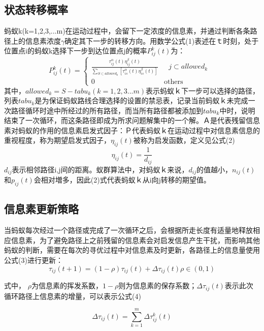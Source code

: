 \documentclass[10pt,a4paper,twocolumn,twoside,UTF8]{ctexart}
\begin{document}
	\subsection{状态转移概率}
	蚂蚁k(k=1,2,3,...m)在运动过程中，会留下一定浓度的信息素，并通过判断各条路径上的信息素浓度$\gamma$确定其下一步的转移方向。用数学公式(1)表述在ｔ时刻，处于位置点i的蚂蚁k选择下一步到达位置点j的概率$P_{ij}^k(t)$为：
		\begin{equation}
			P_{ij}^k(t)=
				\begin{cases}
				\frac{{\tau^ \alpha _{ij}(t) \eta ^ \beta _{ij}(t) }} {{\sum\limits_{S \subset allowed_k} [\tau^ \alpha_{is}(t) \eta^ \beta_{is}(t)] }}& \text{ $j \subset allowed_k$ }\\
				0& \text{others}
				\end{cases}
		\end{equation}	
	其中，$allowed_k = S-tabu_k(k=1,2,3...m)$表示蚂蚁ｋ下一步可以选择的路径，列表$tabu_k$是为保证蚂蚁路线合理选择的设置的禁忌表，记录当前蚂蚁ｋ未完成一次路径循环时途中所经过的所有路径，而当所有路径都被添加到$tabu_k$中时，说明结束了一次循环，而这条路径即成为所求问题解集中的一个解。Ａ是代表残留信息素对蚂蚁的作用的信息素启发式因子：Ｐ代表蚂蚁ｋ在运动过程中对信息素信息的重视程度，称为期望启发式因子，$\eta_{ij}(t)$被称为启发函数，定义见公式(2)
		\begin{equation}
		\eta_{ij}(t) = \frac{1}{d_{ij}}
		\end{equation}
	$d_{ij}$表示相邻路径i,j间的距离。蚁群算法中，对蚂蚁ｋ来说，$d_{ij}$的值越小，$n_{ij}(t)$和$p_{ij}(t)$会相对増多，因此(2)式代表蚂蚁ｋ从i向j转移的期望值。

	\subsection{信息素更新策略}
	当蚂蚁每次经过一个路径或完成了一次循环之后，会根据所走长度有适量地释放相应信息素，为了避免路径上之前残留的信息素会对启发信息产生干扰，而影响其他蚂蚁的判断，需要在每次的寻优过程中对信息素及时更新，各路径上的信息量使用公式(3)进行更新：
	\begin{equation}
		\tau_{ij}(t+1) = (1- \rho ) \tau_{ij}(t) + \Delta \tau_{ij}(t)   \rho\in (0,1)
	\end{equation}

式中， $\rho$为信息素的挥发系数，$1-\rho$则为信息素的保存系数；$\Delta \tau_{ij}(t)$表示此次循环路径上信息素的增量，可以表示公式(4)

	\begin{equation}
		\Delta\tau_{ij}(t) = \sum\limits^m_{k=1}\Delta\tau^k_{ij}(t)
	\end{equation}
\end{document}
